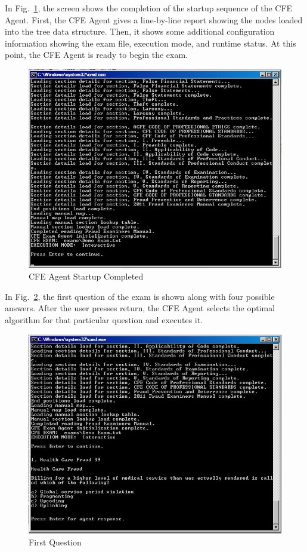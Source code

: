 In Fig.~\ref{fig:cfe_agent_startup_completed}, the screen shows the completion of the startup sequence of the CFE Agent.  First, the CFE Agent gives a line-by-line report showing the nodes loaded into the tree data structure.  Then, it shows some additional configuration information showing the exam file, execution mode, and runtime status.  At this point, the CFE Agent is ready to begin the exam.

\begin{figure}
\centering
\includegraphics[scale=0.75]{screen_shot_2.jpg}
\caption{CFE Agent Startup Completed}
\label{fig:cfe_agent_startup_completed}
\end{figure}

In Fig.~\ref{fig:first_question}, the first question of the exam is shown along with four possible answers.  After the user presses return, the CFE Agent selects the optimal algorithm for that particular question and executes it.  

\begin{figure}
\centering
\includegraphics[scale=0.75]{screen_shot_3.jpg}
\caption{First Question}
\label{fig:first_question}
\end{figure}

